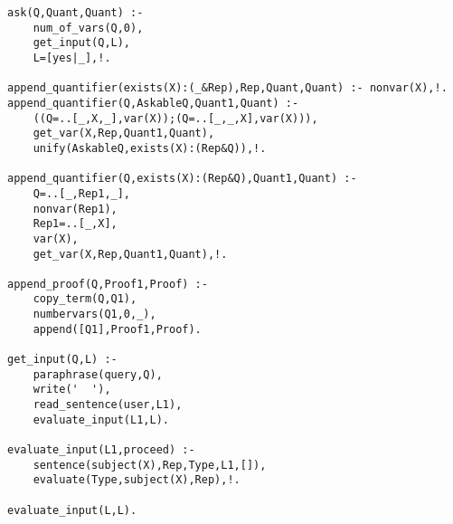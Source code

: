 \begin{verbatim}
ask(Q,Quant,Quant) :-
	num_of_vars(Q,0),
	get_input(Q,L),
	L=[yes|_],!.

append_quantifier(exists(X):(_&Rep),Rep,Quant,Quant) :- nonvar(X),!.
append_quantifier(Q,AskableQ,Quant1,Quant) :-
	((Q=..[_,X,_],var(X));(Q=..[_,_,X],var(X))),
	get_var(X,Rep,Quant1,Quant),
	unify(AskableQ,exists(X):(Rep&Q)),!.

append_quantifier(Q,exists(X):(Rep&Q),Quant1,Quant) :-
	Q=..[_,Rep1,_],
	nonvar(Rep1),
	Rep1=..[_,X],
	var(X),
	get_var(X,Rep,Quant1,Quant),!.

append_proof(Q,Proof1,Proof) :-
	copy_term(Q,Q1),
	numbervars(Q1,0,_),
	append([Q1],Proof1,Proof).

get_input(Q,L) :-
	paraphrase(query,Q),
	write('  '),
	read_sentence(user,L1),
	evaluate_input(L1,L).

evaluate_input(L1,proceed) :-
	sentence(subject(X),Rep,Type,L1,[]),
	evaluate(Type,subject(X),Rep),!.

evaluate_input(L,L).
\end{verbatim}
